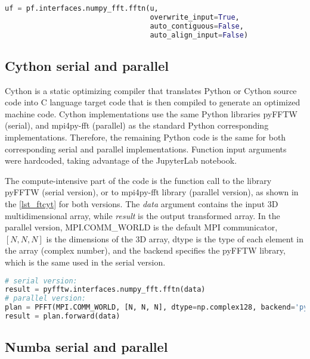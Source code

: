\begin{lstlisting}[float=hbt, language=Python, label={lst_ftpyt}, caption={Compute-intensive part of the FFT test case Python code.}]
uf = pf.interfaces.numpy_fft.fftn(u,
                                  overwrite_input=True,
                                  auto_contiguous=False,
                                  auto_align_input=False)
\end{lstlisting}

%
%
%
\subsection{Cython serial and parallel} %
\label{sec_fftimplcy}

Cython is a static optimizing compiler that translates Python or Cython source code into C language target code that is then compiled to generate an optimized machine code. Cython implementations use the same Python libraries pyFFTW (serial), and mpi4py-fft (parallel) as the standard Python corresponding implementations. Therefore, the remaining Python code is the same for both corresponding serial and parallel implementations. Function input arguments were hardcoded, taking advantage of the JupyterLab notebook.

The compute-intensive part of the code is the function call to the library pyFFTW (serial version), or to mpi4py-fft library (parallel version), as shown in the \autoref {lst_ftcyt} for both versions. The \textit {data} argument contains the input 3D multidimensional array, while \textit {result} is the output transformed array. In the parallel version, MPI.COMM\_WORLD is the default MPI communicator, $[N,N,N]$ is the dimensions of the 3D array, dtype is the type of each element in the array (complex number), and the backend specifies the pyFFTW library, which is the same used in the serial version.

\begin{lstlisting}[float=hbt, language=Python, label={lst_ftcyt}, caption={Compute-intensive part of the FFT test case Cython code.}]
# serial version:
result = pyfftw.interfaces.numpy_fft.fftn(data)
# parallel version:
plan = PFFT(MPI.COMM_WORLD, [N, N, N], dtype=np.complex128, backend='pyfftw')
result = plan.forward(data)
\end{lstlisting}

%
%
%
\subsection{Numba serial and parallel} %
\label{sec_fftimplnumb}

